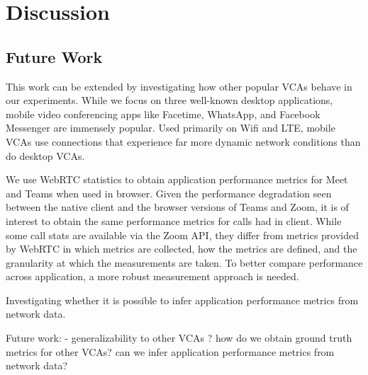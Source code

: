 \section{Discussion}
\label{sec:discussion}
\subsection{Future Work}
This work can be extended by investigating how other popular VCAs behave in our experiments. While we focus on three well-known desktop applications, mobile video conferencing apps like Facetime, WhatsApp, and Facebook Messenger are immensely popular. Used primarily on Wifi and LTE, mobile VCAs use connections that experience far more dynamic network conditions than do desktop VCAs. 

We use WebRTC statistics to obtain application performance metrics for Meet and Teams when used in browser. Given the performance degradation seen between the native client and the browser versions of Teams and Zoom, it is of interest to obtain the same performance metrics for calls had in client. While some call stats are available via the Zoom API, they differ from metrics provided by WebRTC in which metrics are collected, how the metrics are defined, and the granularity at which the measurements are taken. To better compare performance across application, a more robust measurement approach is needed.

Investigating whether it is possible to infer application performance metrics from network data. 


Future work: 
- generalizability to other VCAs ? how do we obtain ground truth metrics for other VCAs? can we infer application performance metrics from network data?  